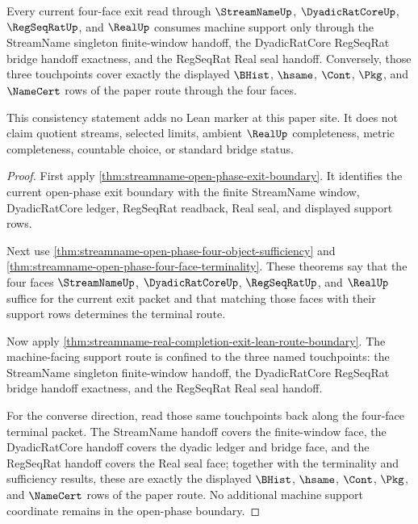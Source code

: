 \begin{theorem}
\label{thm:streamname-four-face-lean-route-consistency}
Every current four-face exit read through $\StreamNameUp$, $\DyadicRatCoreUp$, $\RegSeqRatUp$, and $\RealUp$ consumes machine support only through the StreamName singleton finite-window handoff, the DyadicRatCore RegSeqRat bridge handoff exactness, and the RegSeqRat Real seal handoff. Conversely, those three touchpoints cover exactly the displayed $\BHist$, $\hsame$, $\Cont$, $\Pkg$, and $\NameCert$ rows of the paper route through the four faces.

This consistency statement adds no Lean marker at this paper site. It does not claim quotient streams, selected limits, ambient $\RealUp$ completeness, metric completeness, countable choice, or standard bridge status.
\end{theorem}
\begin{proof}
First apply \autoref{thm:streamname-open-phase-exit-boundary}. It identifies the current open-phase exit boundary with the finite StreamName window, DyadicRatCore ledger, RegSeqRat readback, Real seal, and displayed support rows.

Next use \autoref{thm:streamname-open-phase-four-object-sufficiency} and \autoref{thm:streamname-open-phase-four-face-terminality}. These theorems say that the four faces $\StreamNameUp$, $\DyadicRatCoreUp$, $\RegSeqRatUp$, and $\RealUp$ suffice for the current exit packet and that matching those faces with their support rows determines the terminal route.

Now apply \autoref{thm:streamname-real-completion-exit-lean-route-boundary}. The machine-facing support route is confined to the three named touchpoints: the StreamName singleton finite-window handoff, the DyadicRatCore RegSeqRat bridge handoff exactness, and the RegSeqRat Real seal handoff.

For the converse direction, read those same touchpoints back along the four-face terminal packet. The StreamName handoff covers the finite-window face, the DyadicRatCore handoff covers the dyadic ledger and bridge face, and the RegSeqRat handoff covers the Real seal face; together with the terminality and sufficiency results, these are exactly the displayed $\BHist$, $\hsame$, $\Cont$, $\Pkg$, and $\NameCert$ rows of the paper route. No additional machine support coordinate remains in the open-phase boundary.
\end{proof}

